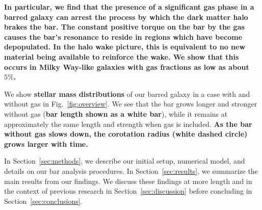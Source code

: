 \documentclass[twocolumn,linenumbers,trackchanges]{aastex631}
\newcommand{\RCR}{\ensuremath{R_{\textrm{CR}}}}
\newcommand{\Rot}{\ensuremath{\mathcal{R}}}
\begin{document}
{\bf In particular, we find that the presence of a significant gas phase in a
barred galaxy can arrest the process by which the dark matter halo brakes the
bar. The constant positive torque on the bar by the gas causes the bar's
resonance to reside in regions which have become depopulated. In the halo wake
picture, this is equivalent to no new material being available to reinforce the
wake. We show that this occurs in Milky Way-like galaxies with gas fractions as
low as about $5\%$.}

We show {\bf stellar mass distributions} of our barred galaxy in a case with and
without gas in Fig.~\ref{fig:overview}. We see that the bar grows longer and
stronger without gas ({\bf bar length shown as a white bar}), while it remains
at approximately the same length and strength when gas is included. {\bf As the
bar without gas slows down, the corotation radius (white dashed circle) grows
larger with time.}


In Section~\ref{sec:methods}, we describe our initial setup, numerical model,
and details on our bar analysis procedures. In Section~\ref{sec:results}, we
summarize the main results from our findings. We discuss these findings at more
length and in the context of previous research in Section~\ref{sec:discussion}
before concluding in Section~\ref{sec:conclusions}.

\end{document}

